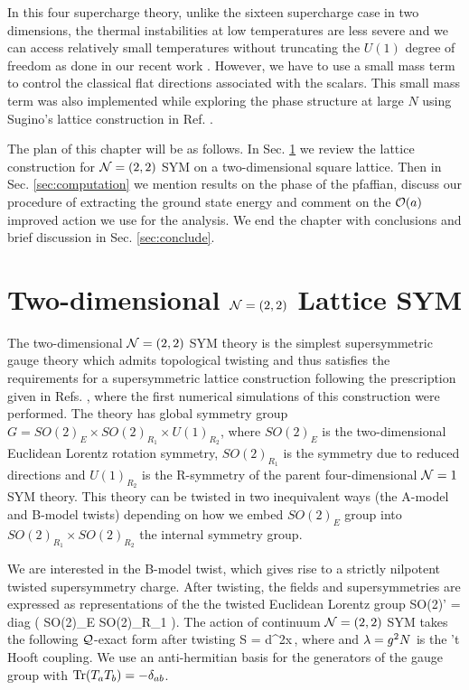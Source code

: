 In this four supercharge theory, unlike the sixteen supercharge case in two dimensions, the thermal instabilities at low temperatures are less severe and we can access relatively small temperatures without truncating the $U(1)$ degree of freedom as done in our recent work \cite{Catterall:2017lub, Jha:2017zad}. However, we have to use a small mass term to control the classical flat directions associated with the scalars. This small mass term was also implemented while exploring the phase structure at large $N$ using Sugino's lattice construction in Ref. \cite{Hanada:2009hq}. 

The plan of this chapter will be as follows. In Sec. \ref{sec:theory} we review the lattice construction for $\mathcal N = (2, 2)$ SYM on a two-dimensional square lattice. Then in Sec. \ref{sec:computation} we mention results on the phase of the pfaffian, discuss our procedure of extracting the ground state energy and comment on the $\mathcal O(a)$ improved action we use for the analysis. We end the chapter with conclusions and brief discussion in Sec. \ref{sec:conclude}.

\section{Two-dimensional $\mathcal N = (2, 2)$ Lattice SYM}
\label{sec:theory}

The two-dimensional $\mathcal N = (2, 2) $ SYM theory is the simplest supersymmetric gauge theory which admits topological twisting \cite{Witten:1988ze} and thus satisfies the requirements for a supersymmetric lattice construction following the prescription given in Refs. \cite{Catterall:2004np, Catterall:2006jw}, where the first numerical simulations of this construction were performed. The theory has global symmetry group $G = SO(2)_E \times SO(2)_{R_1} \times U(1)_{R_2}$, where $SO(2)_E$ is the two-dimensional Euclidean Lorentz rotation symmetry, $SO(2)_{R_1}$ is the symmetry due to reduced directions and $U(1)_{R_2}$ is the R-symmetry of the parent four-dimensional $\mathcal N =1$ SYM theory. This theory can be twisted in two inequivalent ways (the A-model and B-model twists) depending on how we embed $SO(2)_E$ group into $SO(2)_{R_1} \times SO(2)_{R_2}$ the internal symmetry group. 

We are interested in the B-model twist, which gives rise to a strictly nilpotent twisted supersymmetry charge. After twisting, the fields and supersymmetries are expressed as representations of the the twisted Euclidean Lorentz group
\beq
SO(2)' = {\rm diag} \Big( SO(2)_E \times SO(2)_{R_1} \Big).
\eeq 
The action of continuum $\mathcal N = (2, 2)$ SYM takes the following $\mathcal Q$-exact form after twisting
\beq
S =  \cQ \int d^2x\,\Psi,
\label{2daction_twisted}
\eeq
where 
and $\lambda = g^2 N$ is the 't Hooft coupling. We use an anti-hermitian basis for the generators of the gauge group with $\mathrm{Tr} (T_a T_b)  = - \delta_{ab}$.

